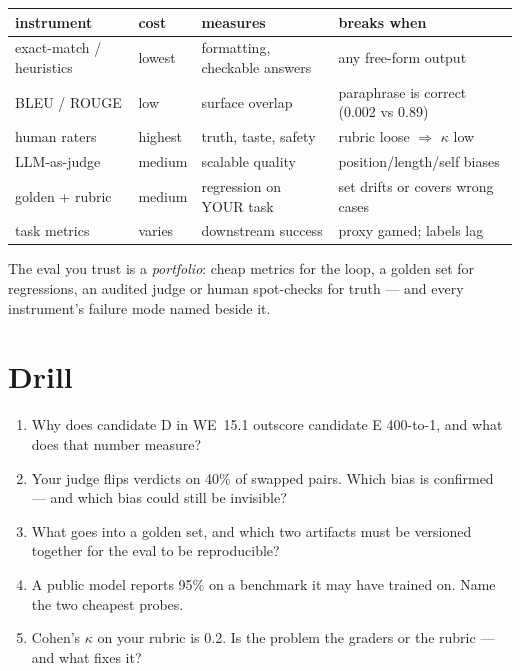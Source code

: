 \begin{center}\small
\begin{tabular}{p{2.6cm}p{3.0cm}p{3.4cm}p{3.2cm}}
\toprule
instrument & cost & measures & breaks when \\
\midrule
exact-match / heuristics & lowest & formatting, checkable answers & any free-form output \\
BLEU / ROUGE & low & surface overlap & paraphrase is correct (0.002 vs 0.89) \\
human raters & highest & truth, taste, safety & rubric loose $\Rightarrow$ $\kappa$ low \\
LLM-as-judge & medium & scalable quality & position/length/self biases \\
golden + rubric & medium & regression on YOUR task & set drifts or covers wrong cases \\
task metrics & varies & downstream success & proxy gamed; labels lag \\
\bottomrule
\end{tabular}
\end{center}

The eval you trust is a \emph{portfolio}: cheap metrics for the loop,
a golden set for regressions, an audited judge or human spot-checks
for truth --- and every instrument's failure mode named beside it.

\section*{Drill}
\begin{enumerate}
\item Why does candidate D in WE~15.1 outscore candidate E 400-to-1,
and what does that number measure?
\item Your judge flips verdicts on 40\% of swapped pairs. Which bias
is confirmed --- and which bias could still be invisible?
\item What goes into a golden set, and which two artifacts must be
versioned together for the eval to be reproducible?
\item A public model reports 95\% on a benchmark it may have trained
on. Name the two cheapest probes.
\item Cohen's $\kappa$ on your rubric is 0.2. Is the problem the
graders or the rubric --- and what fixes it?
\end{enumerate}

